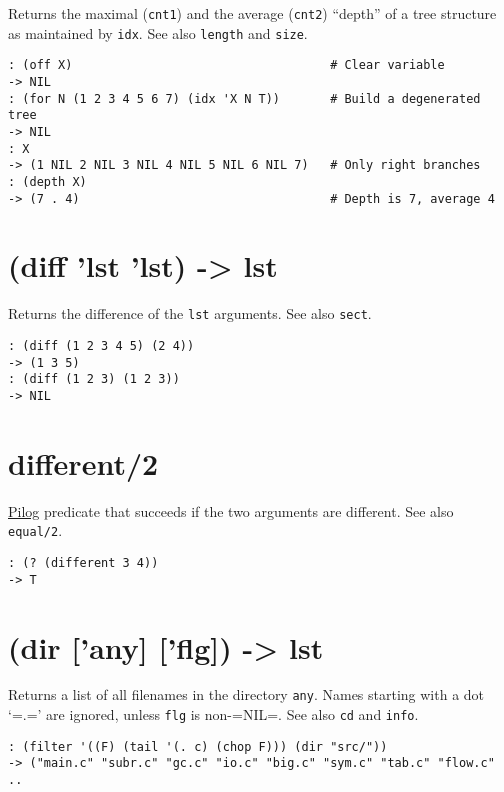 {{{Returns the maximal (\texttt{cnt1}) and the average (\texttt{cnt2}) ``depth'' of a tree
structure as maintained by \texttt{idx}. See also \texttt{length} and \texttt{size}.


\begin{verbatim}
: (off X)                                    # Clear variable
-> NIL
: (for N (1 2 3 4 5 6 7) (idx 'X N T))       # Build a degenerated tree
-> NIL
: X
-> (1 NIL 2 NIL 3 NIL 4 NIL 5 NIL 6 NIL 7)   # Only right branches
: (depth X)
-> (7 . 4)                                   # Depth is 7, average 4
\end{verbatim}

 
\section{(diff 'lst 'lst) -> lst}
\label{sec-8-1-4-31}


Returns the difference of the \texttt{lst} arguments. See also \texttt{sect}.


\begin{verbatim}
: (diff (1 2 3 4 5) (2 4))
-> (1 3 5)
: (diff (1 2 3) (1 2 3))
-> NIL
\end{verbatim}

 
\section{different/2}
\label{sec-8-1-4-32}


\hyperref[ref.html-pilog]{Pilog} predicate that succeeds if the two arguments
are different. See also \texttt{equal/2}.


\begin{verbatim}
: (? (different 3 4))
-> T
\end{verbatim}

 
\section{(dir ['any] ['flg]) -> lst}
\label{sec-8-1-4-33}


Returns a list of all filenames in the directory \texttt{any}. Names starting
with a dot `=.=' are ignored, unless \texttt{flg} is non-=NIL=. See also \texttt{cd}
and \texttt{info}.


\begin{verbatim}
: (filter '((F) (tail '(. c) (chop F))) (dir "src/"))
-> ("main.c" "subr.c" "gc.c" "io.c" "big.c" "sym.c" "tab.c" "flow.c" ..
\end{verbatim}

}}}

